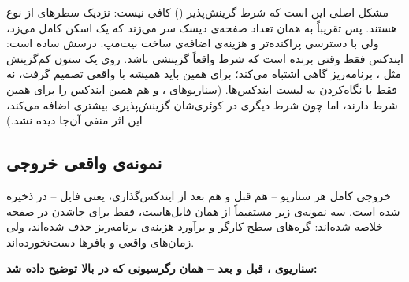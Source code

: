 مشکل اصلی این است که شرط  گزینش‌پذیر () کافی نیست: نزدیک  سطرهای  از نوع  هستند. پس  تقریباً به همان تعداد صفحه‌ی دیسک سر می‌زند که یک اسکن کامل می‌زد، ولی با دسترسی پراکنده‌تر و هزینه‌ی اضافه‌ی ساخت بیت‌مپ. درسش ساده است: ایندکس فقط وقتی برنده است که شرط واقعاً گزینشی باشد. روی یک ستون کم‌گزینش مثل ، برنامه‌ریز گاهی اشتباه می‌کند؛ برای همین باید همیشه با  واقعی تصمیم گرفت، نه فقط با نگاه‌کردن به لیست ایندکس‌ها. (سناریوهای ،  و  هم همین ایندکس  را برای همین شرط دارند، اما چون شرط دیگری در کوئری‌شان گزینش‌پذیری بیشتری اضافه می‌کند، این اثر منفی آن‌جا دیده نشد.)

\subsection{نمونه‌ی واقعی خروجی }
\label{sec:explain-samples}

خروجی کامل  هر  سناریو -- هم قبل و هم بعد از ایندکس‌گذاری، یعنی  فایل -- در  ذخیره شده است. سه نمونه‌ی زیر مستقیماً از همان فایل‌هاست، فقط برای جاشدن در صفحه خلاصه شده‌اند: گره‌های سطح-کارگر و برآورد هزینه‌ی برنامه‌ریز حذف شده‌اند، ولی زمان‌های واقعی و بافرها دست‌نخورده‌اند.

\textbf{سناریوی ، قبل و بعد -- همان رگرسیونی که در بالا توضیح داده شد:}


